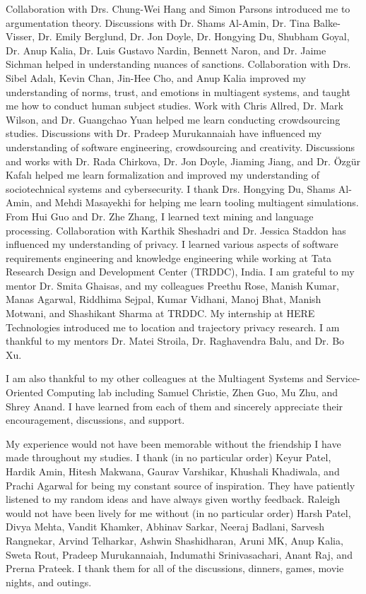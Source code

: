 \begin{acknowledgements}
%
Collaboration with Drs. Chung-Wei Hang and Simon Parsons introduced me to argumentation theory. 
Discussions with Dr. Shams Al-Amin, Dr. Tina Balke-Visser, Dr. Emily Berglund, Dr. Jon Doyle, Dr. Hongying Du, Shubham Goyal, Dr. Anup Kalia, Dr. Luis Gustavo Nardin, Bennett Naron, and Dr. Jaime Sichman helped in understanding nuances of sanctions. 
Collaboration with Drs. Sibel Adal{\i}, Kevin Chan, Jin-Hee Cho, and Anup Kalia improved my understanding of norms, trust, and emotions in multiagent systems, and taught me how to conduct human subject studies. Work with Chris Allred, Dr. Mark Wilson, and Dr. Guangchao Yuan helped me learn conducting crowdsourcing studies. 
Discussions with Dr. Pradeep Murukannaiah have influenced my understanding of software engineering, crowdsourcing and creativity.
Discussions and works with Dr. Rada Chirkova, Dr. Jon Doyle, Jiaming Jiang, and Dr. {\"O}zg{\"u}r Kafal{\i} helped me learn formalization and improved my understanding of sociotechnical systems and cybersecurity. I thank Drs. Hongying Du, Shams Al-Amin, and Mehdi Masayekhi for helping me learn tooling multiagent simulations. 
From Hui Guo and Dr. Zhe Zhang, I learned text mining and language processing. 
Collaboration with Karthik Sheshadri and Dr. Jessica Staddon has influenced my understanding of privacy. 
I learned various aspects of software requirements engineering and knowledge engineering while working at Tata Research Design and Development Center (TRDDC), India. I am grateful to my mentor Dr. Smita Ghaisas, and my colleagues Preethu Rose, Manish Kumar, Manas Agarwal, Riddhima Sejpal, Kumar Vidhani, Manoj Bhat, Manish Motwani, and Shashikant Sharma at TRDDC.
My internship at HERE Technologies introduced me to location and trajectory privacy research. I am thankful to my mentors Dr. Matei Stroila, Dr. Raghavendra Balu, and Dr. Bo Xu. 

I am also thankful to my other colleagues at the Multiagent Systems and Service-Oriented Computing lab including Samuel Christie, Zhen Guo, Mu Zhu, and Shrey Anand. I have learned from each of them and sincerely appreciate their encouragement, discussions, and support. 

My experience would not have been memorable without the friendship I have made throughout my studies. 
I thank (in no particular order) Keyur Patel, Hardik Amin, Hitesh Makwana, Gaurav Varshikar, Khushali Khadiwala, and Prachi Agarwal for being my constant source of inspiration. 
They have patiently listened to my random ideas and have always given worthy feedback. 
Raleigh would not have been lively for me without (in no particular order) Harsh Patel, Divya Mehta, Vandit Khamker, Abhinav Sarkar, Neeraj Badlani, Sarvesh Rangnekar, Arvind Telharkar, Ashwin Shashidharan, Aruni MK, Anup Kalia, Sweta Rout, Pradeep Murukannaiah, Indumathi Srinivasachari, Anant Raj, and Prerna Prateek.
I thank them for all of the discussions, dinners, games, movie nights, and outings. 


\end{acknowledgements}
